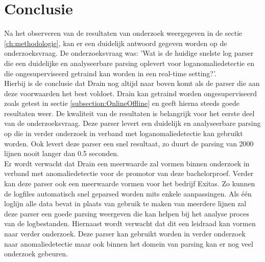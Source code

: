 
\chapter{Conclusie}
\label{ch:conclusie}


Na het observeren van de resultaten van onderzoek weergegeven in de sectie \ref{ch:methodologie}, kan er een duidelijk antwoord gegeven worden op de onderzoeksvraag. De onderzoeksvraag was: 'Wat is de huidige snelste log parser die een duidelijke en analyseerbare parsing oplevert voor loganomaliedetectie en die ongesuperviseerd getraind kan worden in een real-time setting?'.\\

Hierbij is de conclusie dat Drain nog altijd naar boven komt als de parser die aan deze voorwaarden het best voldoet. Drain kan getraind worden ongesuperviseerd zoals getest in sectie \ref{subsection:OnlineOffline} en geeft hierna steeds goede resultaten weer. De kwaliteit van de resultaten is belangrijk voor het eerste deel van de onderzoeksvraag. Deze parser levert een duidelijk en analyseerbare parsing op die in verder onderzoek in verband met loganomaliedetectie kan gebruikt worden. Ook levert deze parser een snel resultaat, zo duurt de parsing van 2000 lijnen nooit langer dan 0.5 seconden.\\

Er wordt verwacht dat Drain een meerwaarde zal vormen binnen onderzoek in verband met anomaliedetectie voor de promotor van deze bachelorproef. Verder kan deze parser ook een meerwaarde vormen voor het bedrijf Exitas. Zo kunnen de logfiles automatisch snel geparsed worden mits enkele aanpassingen. Als één loglijn alle data bevat in plaats van gebruik te maken van meerdere lijnen zal deze parser een goede parsing weergeven die kan helpen bij het analyse proces van de logbestanden. Hiernaast wordt verwacht dat dit een leidraad kan vormen naar verder onderzoek. Deze parser kan gebruikt worden in verder onderzoek naar anomaliedetectie maar ook binnen het domein van parsing kan er nog veel onderzoek gebeuren.\\

